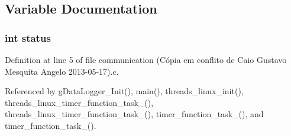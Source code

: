 \subsection{Variable Documentation}
\hypertarget{communication_01_07C_xC3_xB3pia_01em_01conflito_01de_01Caio_01Gustavo_01Mesquita_01Angelo_012013-05-17_08_8c_a6e27f49150e9a14580fb313cc2777e00}{
\subsubsection[{status}]{\setlength{\rightskip}{0pt plus 5cm}int status}}\label{communication_01_07C_xC3_xB3pia_01em_01conflito_01de_01Caio_01Gustavo_01Mesquita_01Angelo_012013-05-17_08_8c_a6e27f49150e9a14580fb313cc2777e00}


Definition at line 5 of file communication (\-Cópia em conflito de Caio Gustavo Mesquita Angelo 2013-\/05-\/17).\-c.



Referenced by g\-Data\-Logger\-\_\-\-Init(), main(), threads\-\_\-linux\-\_\-init(), threads\-\_\-linux\-\_\-timer\-\_\-function\-\_\-task\-\_(), threads\-\_\-linux\-\_\-timer\-\_\-function\-\_\-task\-\_(), timer\-\_\-function\-\_\-task\-\_(), and timer\-\_\-function\-\_\-task\-\_().

